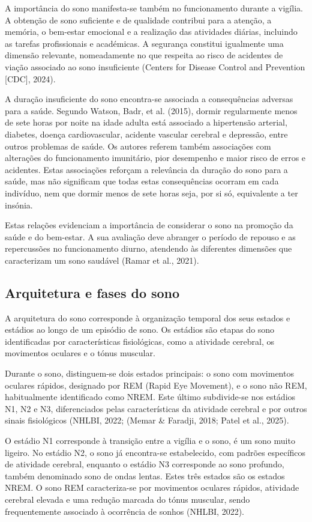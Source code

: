 A importância do sono manifesta-se também no funcionamento durante a vigília. A obtenção de sono suficiente e de qualidade contribui para a atenção, a memória, o bem-estar emocional e a realização das atividades diárias, incluindo as tarefas profissionais e académicas. A segurança constitui igualmente uma dimensão relevante, nomeadamente no que respeita ao risco de acidentes de viação associado ao sono insuficiente (Centers for Disease Control and Prevention [CDC], 2024).

A duração insuficiente do sono encontra-se associada a consequências adversas para a saúde. Segundo Watson, Badr, et al. (2015), dormir regularmente menos de sete horas por noite na idade adulta está associado a hipertensão arterial, diabetes, doença cardiovascular, acidente vascular cerebral e depressão, entre outros problemas de saúde. Os autores referem também associações com alterações do funcionamento imunitário, pior desempenho e maior risco de erros e acidentes. Estas associações reforçam a relevância da duração do sono para a saúde, mas não significam que todas estas consequências ocorram em cada indivíduo, nem que dormir menos de sete horas seja, por si só, equivalente a ter insónia.

Estas relações evidenciam a importância de considerar o sono na promoção da saúde e do bem-estar. A sua avaliação deve abranger o período de repouso e as repercussões no funcionamento diurno, atendendo às diferentes dimensões que caracterizam um sono saudável (Ramar et al., 2021).

\subsection{Arquitetura e fases do sono}
\label{sec:chap2_sleepCycle}

A arquitetura do sono corresponde à organização temporal dos seus estados e estádios ao longo de um episódio de sono. Os estádios são etapas do sono identificadas por características fisiológicas, como a atividade cerebral, os movimentos oculares e o tónus muscular.

Durante o sono, distinguem-se dois estados principais: o sono com movimentos oculares rápidos, designado por REM (Rapid Eye Movement), e o sono não REM, habitualmente identificado como NREM. Este último subdivide-se nos estádios N1, N2 e N3, diferenciados pelas características da atividade cerebral e por outros sinais fisiológicos (NHLBI, 2022; (Memar \& Faradji, 2018; Patel et al., 2025).

O estádio N1 corresponde à transição entre a vigília e o sono, é um sono muito ligeiro. No estádio N2, o sono já encontra-se estabelecido, com padrões específicos de atividade cerebral, enquanto o estádio N3 corresponde ao sono profundo, também denominado sono de ondas lentas. Estes três estados são os estados NREM. O sono REM caracteriza-se por movimentos oculares rápidos, atividade cerebral elevada e uma redução marcada do tónus muscular, sendo frequentemente associado à ocorrência de sonhos (NHLBI, 2022).

